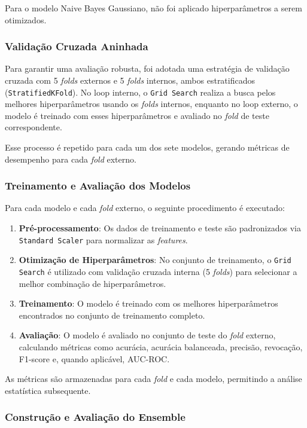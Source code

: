 \documentclass[a4paper]{article}
\theoremstyle{plain}
\theoremstyle{definition}
\begin{document}
Para o modelo Naive Bayes Gaussiano, não foi aplicado hiperparâmetros a serem otimizados.

\subsubsection{Validação Cruzada Aninhada}
Para garantir uma avaliação robusta, foi adotada uma estratégia de validação cruzada com 5 \textit{folds} externos e 5 \textit{folds} internos, ambos estratificados (\texttt{StratifiedKFold}). No loop interno, o \texttt{Grid Search} realiza a busca pelos melhores hiperparâmetros usando os \textit{folds} internos, enquanto no loop externo, o modelo é treinado com esses hiperparâmetros e avaliado no \textit{fold} de teste correspondente.

Esse processo é repetido para cada um dos sete modelos, gerando métricas de desempenho para cada \textit{fold} externo.

\subsubsection{Treinamento e Avaliação dos Modelos}
Para cada modelo e cada \textit{fold} externo, o seguinte procedimento é executado:

\begin{enumerate}
    \item \textbf{Pré-processamento}: Os dados de treinamento e teste são padronizados via \texttt{Standard Scaler} para normalizar as \textit{features}.
    \item \textbf{Otimização de Hiperparâmetros}: No conjunto de treinamento, o \texttt{Grid Search} é utilizado com validação cruzada interna (5 \textit{folds}) para selecionar a melhor combinação de hiperparâmetros.
    \item \textbf{Treinamento}: O modelo é treinado com os melhores hiperparâmetros encontrados no conjunto de treinamento completo.
    \item \textbf{Avaliação}: O modelo é avaliado no conjunto de teste do \textit{fold} externo, calculando métricas como acurácia, acurácia balanceada, precisão, revocação, F1-score e, quando aplicável, AUC-ROC.
\end{enumerate}

As métricas são armazenadas para cada \textit{fold} e cada modelo, permitindo a análise estatística subsequente.

\subsubsection{Construção e Avaliação do Ensemble}
\end{document}
